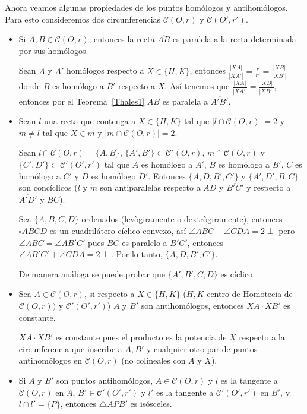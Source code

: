 Ahora veamos algunas propiedades de los puntos homólogos y antihomólogos. Para esto consideremos dos circunferencias $\mathcal{C}(O,r)$ y $\mathcal{C}(O',r')$.
\begin{itemize}
\item Si $A,B\in\mathcal{C}(O,r)$, entonces la recta $\overline{AB}$ es paralela a la recta determinada por sus homólogos. 

\begin{pba}
Sean $A$ y $A'$ homólogos respecto a $X\in\{H,K\}$, entonces $\frac{|XA|}{|XA'|}=\frac{r}{r'}=\frac{|XB|}{|XB'|}$ donde $B$ es homólogo a $B'$ respecto a $X$. Así tenemos que $\frac{|XA|}{|XA'|}=\frac{|XB|}{|XB'|}$, entonces por el Teorema~\ref{Thales1} $\overline{AB}$ es paralela a $\overline{A'B'}$.
\end{pba}
\item Sean $l$ una recta que contenga a $X\in\{H,K\}$ tal que $|l\cap\mathcal{C}(O,r)|=2$ y $m\neq l$ tal que $X\in m$ y $|m\cap\mathcal{C}(O,r)|=2$.

Sean $l\cap\mathcal{C}(O,r)=\{A,B\}$, $\{A',B'\}\subset\mathcal{C'}(O,r)$, $m\cap\mathcal{C}(O,r)$ y $\{C',D'\}\subset\mathcal{C'}(O',r')$ tal que $A$ es homólogo a $A'$, $B$ es homólogo a $B'$, $C$ es homólogo a $C'$ y $D$ es homólogo $D'$. Entonces $\{A,D,B',C'\}$ y $\{A',D',B,C\}$ son concíclicos ($l$ y $m$ son antiparalelas respecto a $\overline{AD}$ y $\overline{B'C'}$ y respecto a $\overline{A'D'}$ y $\overline{BC}$).

\begin{pba}
Sea $\{A,B,C,D\}$ ordenados (levògiramente o dextrògiramente), entonces $\square ABCD$ es un cuadrilátero cíclico convexo, así $\angle ABC+\angle CDA=2\perp$ pero $\angle ABC=\angle AB'C'$ pues $BC$ es paralelo a $B'C'$, entonces $\angle AB'C'+\angle CDA=2\perp$. Por lo tanto, $\{A,D,B',C'\}$.

De manera análoga se puede probar que $\{A',B',C,D\}$ es cíclico. 
\end{pba}
\item Sea $A\in\mathcal{C}(O,r)$, si respecto a $X\in\{H,K\}$ ($H,K$ centro de Homotecia de $\mathcal{C}(O,r))$ y $\mathcal{C'}(O',r')$) $A$ y $B'$ son antihomólogos, entonces $XA\cdot XB'$ es constante.

\begin{pba}
$XA\cdot XB'$ es constante pues el producto es la potencia de $X$ respecto a la circunferencia que inscribe a $A,B'$ y cualquier otro par de puntos antihomólogos en $\mathcal{C}(O,r)$ (no colineales con $A$ y $X$).
\end{pba}
\item Si $A$ y $B'$ son puntos antihomólogos, $A\in\mathcal{C}(O,r)$ y $l$ es la tangente a $\mathcal{C}(O,r)$ en $A$, 
$B'\in\mathcal{C'}(O',r')$ y $l'$ es la tangente a $\mathcal{C'}(O',r')$ en $B'$, y  $l\cap l'=\{P\}$, entonces $\triangle APB'$ es isósceles. 


\end{itemize}
